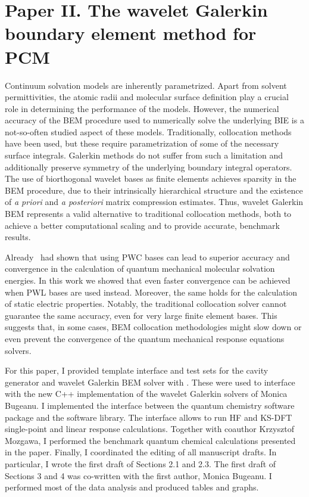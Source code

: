 \section*{Paper II. The wavelet Galerkin boundary element method for PCM}

Continuum solvation models are inherently parametrized. Apart from solvent permittivities,
the atomic radii and molecular surface definition play a crucial role
in determining the performance of the models.
However, the numerical accuracy of the \acs{BEM} procedure used to numerically solve the
underlying \acs{BIE} is a not-so-often studied aspect of these models.
Traditionally, collocation methods have been used, but these require parametrization of some of the necessary surface integrals.
Galerkin methods do not suffer from such a limitation and additionally preserve symmetry of the underlying
boundary integral operators.
The use of biorthogonal wavelet bases as finite elements achieves sparsity in
the \acs{BEM} procedure, due to their intrinsically hierarchical structure and
the existence of \emph{a priori} and \emph{a posteriori} matrix compression
estimates.
Thus, wavelet Galerkin \acs{BEM} represents a valid alternative to traditional
collocation methods, both to achieve a better computational scaling and to
provide accurate, benchmark results.\autocite{Harbrecht2004-uo,
Harbrecht2006-ug, Dahmen2006-pj}

Already~\citeauthor{Weijo2010-hy} had shown that using \ac{PWC} bases can lead
to superior accuracy and convergence in the calculation of quantum mechanical
molecular solvation energies.
In this work we showed that even faster convergence can be achieved when
\ac{PWL} bases are used instead.
Moreover, the same holds for the calculation of static electric properties.
Notably, the traditional collocation solver cannot guarantee the same accuracy,
even for very large finite element bases. This suggests that, in some cases,
\acs{BEM} collocation methodologies might slow down or even prevent the
convergence of the quantum mechanical response equations solvers.

For this paper, I provided template interface and test sets for the cavity
generator\autocite{Harbrecht2009-no, Harbrecht2011-dk} and wavelet Galerkin
\acs{BEM} solver\autocite{Harbrecht2004-uo, Harbrecht2006-ug} with \pcmsolver.
These were used to interface with the new C++ implementation of the wavelet
Galerkin solvers of Monica Bugeanu.
I implemented the interface between the \LSDALTON quantum chemistry software
package and the \pcmsolver software library. The interface allows to run \acs{HF} and
\acs{KS}-\acs{DFT} single-point and linear response calculations.
Together with coauthor Krzysztof Mozgawa, I performed the benchmark quantum
chemical calculations presented in the paper.
Finally, I coordinated the editing of all manuscript drafts.
In particular, I wrote the first draft of Sections 2.1 and 2.3.
The first draft of Sections 3 and 4 was co-written with the first author, Monica Bugeanu.
I performed most of the data analysis and produced tables and graphs.

